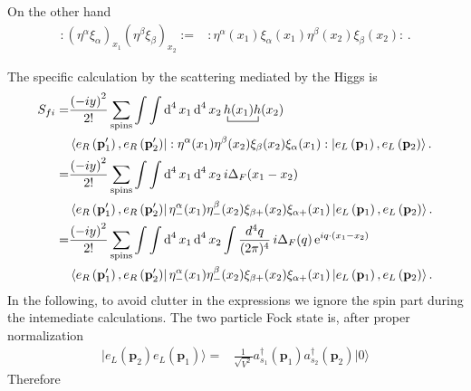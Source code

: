 On the other hand 
\begin{align}
\label{eq:156f}
  :(\eta^{\alpha} \xi_{\alpha})_{x_1}(\eta^{\beta} \xi_{\beta})_{x_2}:=&
:\eta^{\alpha}(x_1) \xi_{\alpha}(x_1) \eta^{\beta}(x_2) \xi_{\beta}(x_2):\,.
\end{align}




The specific calculation by the scattering mediated by the Higgs is 
\begin{align}
  S_{fi}=&\frac{\left( -iy \right)^{2}}{2!}\sum_{\text{spins}}\int\int \operatorname{d}^4x_1 \operatorname{d}^4x_2
\bcontraction{\,}{h}{(x_1)}{h}\,h(x_1)h(x_2) \nonumber\\
&\left\langle e_R\left(\mathbf{p}'_1\right), e_R \left(\mathbf{p}'_2\right) \right|
  :\eta^{\alpha}(x_1) \eta^{\beta}(x_2)\xi_{\beta}(x_2) \xi_{\alpha}(x_1):
 \left| e_L \left(\mathbf{p}_1\right), e_L\left(\mathbf{p}_2\right) \right\rangle. \nonumber\\
  =&\frac{\left( -iy \right)^{2}}{2!}\sum_{\text{spins}}\int\int \operatorname{d}^4x_1 \operatorname{d}^4x_2
\,i\Delta_F(x_1-x_2) \nonumber\\
&\left\langle e_R\left(\mathbf{p}'_1\right), e_R \left(\mathbf{p}'_2\right) \right|
  \eta^{\alpha}_{-}(x_1) \eta^{\beta}_{-}(x_2)\xi_{\beta +}(x_2) \xi_{\alpha +}(x_1)
 \left| e_L \left(\mathbf{p}_1\right), e_L\left(\mathbf{p}_2\right) \right\rangle. \nonumber\\
  =&\frac{\left( -iy \right)^{2}}{2!}\sum_{\text{spins}}\int\int \operatorname{d}^4x_1 \operatorname{d}^4x_2
\int\frac{d^4q}{(2\pi)^4}\,i\Delta_F(q)\operatorname{e}^{i q\cdot(x_1-x_2)} \nonumber\\
&\left\langle e_R\left(\mathbf{p}'_1\right), e_R \left(\mathbf{p}'_2\right) \right|
  \eta^{\alpha}_{-}(x_1) \eta^{\beta}_{-}(x_2)\xi_{\beta +}(x_2) \xi_{\alpha +}(x_1)
 \left| e_L \left(\mathbf{p}_1\right), e_L\left(\mathbf{p}_2\right) \right\rangle. 
\end{align}
In the following, to avoid clutter in the expressions we ignore the spin part during the intemediate calculations. 
The two particle Fock state is, after proper normalization
\begin{align}
  |e_L(\mathbf{p}_2)e_L(\mathbf{p}_1)\rangle=&\frac{1}{\sqrt{V^2}}a_{s_1}^\dagger(\mathbf{p}_1)a_{s_2}^\dagger(\mathbf{p}_2)|0\rangle
\end{align}
Therefore %
